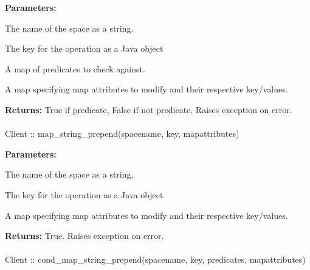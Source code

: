 \noindent\textbf{Parameters:}
\begin{description}[labelindent=\widthof{{\code{mapattributes}}},leftmargin=*,noitemsep,nolistsep,align=right]
\item[\code{spacename}] The name of the space as a string.
\item[\code{key}] The key for the operation as a Java object
\item[\code{predicates}] A map of predicates to check against.
\item[\code{mapattributes}] A map specifying map attributes to modify and their respective key/values.
\end{description}

\noindent\textbf{Returns:}
True if predicate, False if not predicate.  Raises exception on error.

\paragraph{}
\label{api:java:map_string_prepend}
\begin{javacode}
Client :: map_string_prepend(spacename, key, mapattributes)
\end{javacode}
\funcdesc 

\noindent\textbf{Parameters:}
\begin{description}[labelindent=\widthof{{\code{mapattributes}}},leftmargin=*,noitemsep,nolistsep,align=right]
\item[\code{spacename}] The name of the space as a string.
\item[\code{key}] The key for the operation as a Java object
\item[\code{mapattributes}] A map specifying map attributes to modify and their respective key/values.
\end{description}

\noindent\textbf{Returns:}
True.  Raises exception on error.

\paragraph{}
\label{api:java:cond_map_string_prepend}
\begin{javacode}
Client :: cond_map_string_prepend(spacename, key, predicates, mapattributes)
\end{javacode}
\funcdesc 

